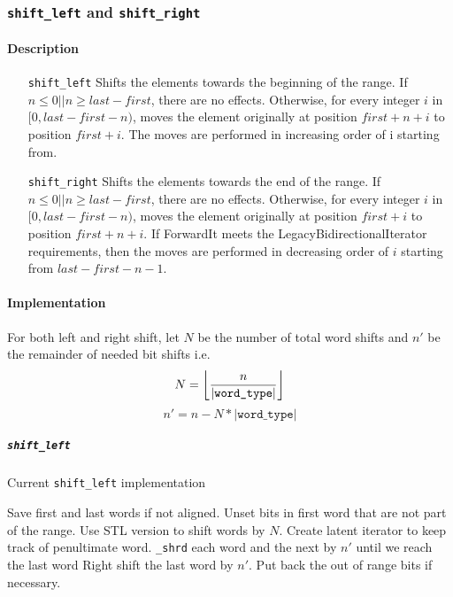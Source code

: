 \documentclass[letterpaper, 8pt, twocolumn]{article}
\DeclarePairedDelimiter\floor{\lfloor}{\rfloor}
\begin{document}
\subsubsection{\texttt{shift\_left} and \texttt{shift\_right}}
\label{subsubsec:shift}
\paragraph{Description}
\begin{itemize}
    \item[\texttt{shift\_left}] Shifts the elements towards the beginning of the 
            range. If $n \leq 0 || n \geq last - first$, there are no effects. 
            Otherwise, for every integer $i$ in $[0, last - first - n)$, moves 
            the element originally at position $first + n + i$ to position 
            $first + i$. The moves are performed in increasing order of i 
            starting from.
    \item[\texttt{shift\_right}] Shifts the elements towards the end of the 
        range. If $n \leq 0 || n \geq last - first$, there are no effects. 
        Otherwise, for every integer $i$ in $[0, last - first - n)$, moves the 
        element originally at position $first + i$ to position $first + n + i$. 
        If ForwardIt meets the LegacyBidirectionalIterator requirements, then 
        the moves are performed in decreasing order of $i$ starting from 
        $last - first - n - 1$.
\end{itemize}

\paragraph{Implementation}
For both left and right shift, let $N$ be the number of total word shifts and 
$n'$ be the remainder of needed bit shifts i.e.
$$N=\floor*{\frac{n}{|\texttt{word\_type}|}}$$ $$n'=n-N*|\texttt{word\_type}|$$
\subparagraph{\texttt{shift\_left}}

\begin{algorithm}[H]
    \caption{Current \texttt{shift\_left} implementation}
    \begin{algorithmic}[1]
            \State Save first and last words if not aligned.
            \State Unset bits in first word that are not part of 
            the range.
            \State Use STL version to shift words by $N$.
            \State Create latent iterator to keep track of penultimate word.
            \State \texttt{\_shrd} each word and the next by $n'$ until we 
            reach the last word
            \State Right shift the last word by $n'$.
            \State Put back the out of range bits if necessary.
        \EndFunction
    \end{algorithmic}
\end{algorithm}
\end{document}
